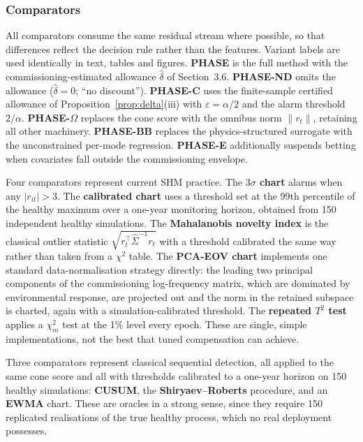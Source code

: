 \documentclass[12pt,a4paper]{article}
\newcommand{\rev}[1]{#1}
\newcommand{\rev}[1]{{\color{revcol}#1}}
\begin{document}
\subsubsection{Comparators}\label{sec:comparators}

All comparators consume the same residual stream where possible, so that differences reflect the decision rule rather than the features. \rev{Variant labels are used identically in text, tables and figures. \textbf{PHASE} is the full method with the commissioning-estimated allowance $\hat\delta$ of Section~3.6. \textbf{PHASE-ND} omits the allowance ($\hat\delta=0$; ``no discount''). \textbf{PHASE-C} uses the finite-sample certified allowance of Proposition~\ref{prop:delta}(iii) with $\varepsilon=\alpha/2$ and the alarm threshold $2/\alpha$. \textbf{PHASE-$\Omega$} replaces the cone score with the omnibus norm $\|r_t\|$, retaining all other machinery. \textbf{PHASE-BB} replaces the physics-structured surrogate with the unconstrained per-mode regression. \textbf{PHASE-E} additionally suspends betting when covariates fall outside the commissioning envelope.}

Four comparators represent current SHM practice. The \textbf{$3\sigma$ chart} alarms when any $|r_{it}|>3$. The \textbf{calibrated chart} uses a threshold set at the 99th percentile of the healthy maximum over a one-year monitoring horizon, obtained from 150 independent healthy simulations. The \textbf{Mahalanobis novelty index} is the classical outlier statistic $\sqrt{r_t^\top\hat\Sigma^{-1}r_t}$ with a threshold calibrated the same way rather than taken from a $\chi^2$ table. The \textbf{PCA-EOV chart} implements one standard data-normalisation strategy directly: the leading two principal components of the commissioning log-frequency matrix, which are dominated by environmental response, are projected out and the norm in the retained subspace is charted, again with a simulation-calibrated threshold. The \textbf{repeated $T^2$ test} applies a $\chi^2_m$ test at the 1\% level every epoch. \rev{These are single, simple implementations, not the best that tuned compensation can achieve.}

Three comparators represent classical sequential detection, all applied to the same cone score and all with thresholds calibrated to a one-year horizon on 150 healthy simulations: \textbf{CUSUM}, the \textbf{Shiryaev--Roberts} procedure, and an \textbf{EWMA} chart. These are oracles in a strong sense, since they require 150 replicated realisations of the true healthy process, which no real deployment possesses.
\end{document}
